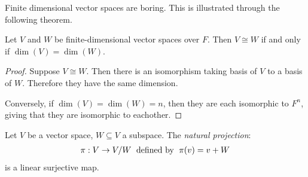     Finite dimensional vector spaces are boring. This is illustrated through the following theorem.

    \begin{theorem}
        Let $V$ and $W$ be finite-dimensional vector spaces over $F$. Then $V \cong W$ if and only if $\dim(V) = \dim(W)$.
    \end{theorem}
        \begin{proof}
            Suppose $V \cong W$. Then there is an isomorphism taking basis of $V$ to a basis of $W$. Therefore they have the same dimension.

            Conversely, if $\dim(V) = \dim(W) = n$, then they are each isomorphic to $F^n$, giving that they are isomorphic to eachother.
        \end{proof}

        \begin{center}
        \end{center}

    \begin{example}
        Let $V$ be a vector space, $W \subseteq V$ a subspace. The \textit{natural projection}:
            \begin{equation*}
            \begin{split}
                \pi:V \rightarrow V/W \hspace{6pt}\text{defined by}\hspace{6pt}\pi(v) = v+W
            \end{split}
            \end{equation*}
        is a linear surjective map.
    \end{example}

